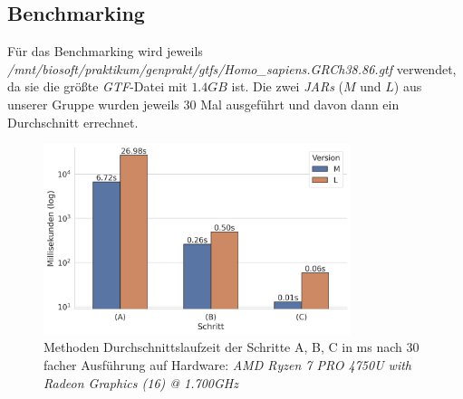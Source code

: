\documentclass[12pt]{article}
\begin{document}
\subsection{Benchmarking}
Für das Benchmarking wird jeweils \textit{/mnt/biosoft/praktikum/genprakt/gtfs/Homo\_sapiens.GRCh38.86.gtf} verwendet, da sie die grö\ss te \textit{GTF}-Datei mit $1.4GB$ ist.
Die zwei \textit{JARs} ($M$ und $L$) aus unserer Gruppe wurden jeweils 30 Mal ausgeführt und davon dann ein Durchschnitt errechnet.

\begin{figure}[htpb]
	\centering
	\includegraphics[width=0.8\textwidth]{./plots/benchmark_time.jpg}
	\caption{Methoden Durchschnittslaufzeit der Schritte A, B, C  in ms nach 30 facher Ausführung auf Hardware: \textit{AMD Ryzen 7 PRO 4750U with Radeon Graphics (16) @ 1.700GHz}}

	\label{fig:-plots-benchmark_time-jpg}
\end{figure}
\end{document}
